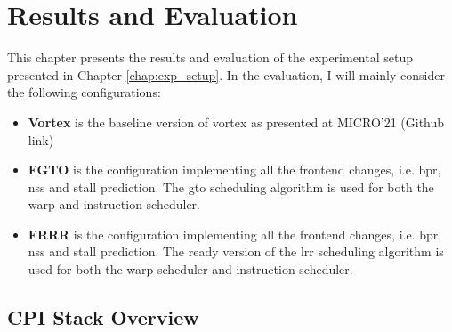 \chapter{Results and Evaluation} \label{chap:results}



This chapter presents the results and evaluation of the experimental setup presented in Chapter \ref{chap:exp_setup}. In the evaluation, I will mainly consider the following configurations:

\begin{itemize}
    \item \textbf{Vortex} is the baseline version of \Gls{vortex} as presented at MICRO'21 \cite{vortex} (Github link)
    \item \textbf{FGTO} is the configuration implementing all the frontend changes, i.e. \acrshort{bpr}, \acrshort{nss} and stall prediction. The \acrshort{gto} scheduling algorithm is used for both the warp and instruction scheduler.
    \item \textbf{FRRR} is the configuration implementing all the frontend changes, i.e. \acrshort{bpr}, \acrshort{nss} and stall prediction. The ready version of the \acrshort{lrr} scheduling algorithm is used for both the warp scheduler and instruction scheduler.
\end{itemize}

\section{CPI Stack Overview}


